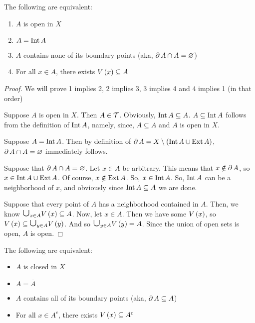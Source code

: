 \documentclass{article}
\begin{document}
\begin{proposition}
\label{book:prop:2.8g}
    The following are equivalent:
    \begin{enumerate}
        \item $A$ is open in $X$
        \item $A = \textnormal{Int} \, A$
        \item $A$ contains none of its boundary points (aka, $\partial \, A \cap A = \varnothing$)
        \item For all $x \in A$, there exists $V\left(x\right) \subseteq A$
    \end{enumerate}
\end{proposition}

\begin{proof}
    We will prove 1 implies 2, 2 implies 3, 3 implies 4 and 4 implies 1 (in that order)
    
    Suppose $A$ is open in $X$. Then $A \in \mathcal{T}$. Obviously, $\textnormal{Int} \, A \subseteq A$.
    $A \subseteq \textnormal{Int} \, A$ follows from the definition of $\textnormal{Int} \, A$, namely, since,
    $A \subseteq A$ and $A$ is open in $X$.

    Suppose $A = \textnormal{Int} \, A$.
    Then by definition of $\partial \, A = X \setminus \left(\textnormal{Int} \, A \cup \textnormal{Ext} \, A\right)$,
    $\partial \, A \cap A = \varnothing$ immediately follows.

    Suppose that $\partial \, A \cap A = \varnothing$. Let $x \in A$ be arbitrary.
    This means that $x \notin \partial \, A$, so $x \in \textnormal{Int} \, A \cup \textnormal{Ext} \, A$. Of course,
    $x \notin \textnormal{Ext} \, A$. So, $x \in \textnormal{Int} \, A$. So, $\textnormal{Int} \, A$ can be a neighborhood of
    $x$, and obviously since $\textnormal{Int} \, A \subseteq A$ we are done.

    Suppose that every point of $A$ has a neighborhood contained in $A$. Then, we know
    $\medcup_{x \in A} \nbhd{x} \subseteq A$. Now, let $x \in A$. Then we have some $V\left(x\right)$,
    so $\nbhd{x} \subseteq \medcup_{y \in A} \nbhd{y}$. And so $\medcup_{y \in A} \nbhd{y} = A$.
    Since the union of open sets is open, $A$ is open.
\end{proof}

\begin{proposition}
\label{book:prop:2.8h}
     The following are equivalent:
    \begin{itemize}
        \item $A$ is closed in $X$
        \item $A = \overline{A}$
        \item $A$ contains all of its boundary points (aka, $\partial \, A \subseteq A$)
        \item For all $x \in A^c$, there exists $V\left(x\right) \subseteq A^c$
    \end{itemize}
\end{proposition}
\end{document}
